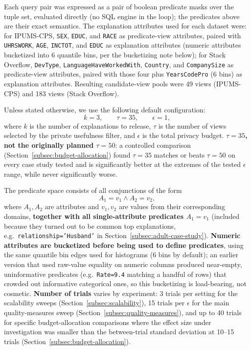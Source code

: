 Each query pair was expressed as a pair of boolean predicate masks over
the tuple set, evaluated directly (no SQL engine in the loop); the
predicates above are their exact semantics. The explanation attributes
used for each dataset were: for IPUMS-CPS, \texttt{SEX}, \texttt{EDUC},
and \texttt{RACE} as predicate-view attributes, paired with
\texttt{UHRSWORK}, \texttt{AGE}, \texttt{INCTOT}, and \texttt{EDUC} as
explanation attributes (numeric attributes bucketized into 6 quantile
bins, per the bucketizing note below); for Stack Overflow,
\texttt{DevType}, \texttt{LanguageHaveWorkedWith}, \texttt{Country}, and
\texttt{CompanySize} as predicate-view attributes, paired with those four
plus \texttt{YearsCodePro} (6 bins) as explanation attributes. Resulting
candidate-view pools were 49 views (IPUMS-CPS) and 183 views (Stack
Overflow).

Unless stated otherwise, we use the following default configuration:
\[
    k = 3, \qquad \tau = 35, \qquad \epsilon = 1,
\]
where $k$ is the number of explanations to release, $\tau$ is the number of views
selected by the private usefulness filter, and $\epsilon$ is the total privacy
budget. \textbf{$\tau=35$, not the originally planned $\tau=50$}: a
controlled comparison (Section~\ref{subsec:budget-allocation}) found
$\tau=35$ matches or beats $\tau=50$ on every case study tested and is
significantly better at the extremes of the tested $\epsilon$ range,
while never significantly worse.

The predicate space consists of all conjunctions of the form
\[
    A_1 = v_1 \wedge A_2 = v_2,
\]
where $A_1,A_2$ are attributes and $v_1,v_2$ are values from their corresponding
domains, \textbf{together with all single-attribute predicates $A_1=v_1$}
(included because they turned out to be common top explanations, e.g.\
\texttt{relationship='Husband'} in Section~\ref{subsec:adult-case-study}).
\textbf{Numeric attributes are bucketized before being used to define
predicates}, using the same quantile bin edges used for histograms
(6 bins by default); an earlier version that used raw-value equality on
numeric columns produced near-empty, uninformative predicates (e.g.\
\texttt{Rate=9.4} matching a handful of rows) that crowded out
informative categorical ones, so this bucketizing is load-bearing, not
cosmetic. \textbf{Number of trials} varies by experiment: 3 trials per
setting for the scalability sweeps (Section~\ref{subsec:scalability}),
15 trials per $\epsilon$ for the main quality-measures sweep
(Section~\ref{subsec:quality-measures}), and up to 40 trials for specific
budget-allocation comparisons where the effect size under investigation
was smaller than the between-trial standard deviation at 10--15 trials
(Section~\ref{subsec:budget-allocation}).

